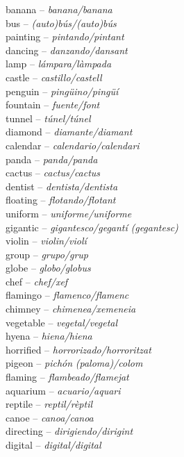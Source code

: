 \documentclass[output=paper,modfonts,nonflat,newtxmath]{langsci/langscibook}
\begin{document}
\noindent
banana  – \textit{banana/banana} \\
bus  – \textit{(auto)bús/(auto)bús}\\
painting  – \textit{pintando/pintant}\\
dancing  – \textit{danzando/dansant}\\
lamp  – \textit{lámpara/làmpada}\\
castle  – \textit{castillo/castell}\\
penguin  – \textit{pingüino/pingüí}\\
fountain  – \textit{fuente/font}\\
tunnel  – \textit{túnel/túnel} \\
diamond  – \textit{diamante/diamant} \\
calendar  – \textit{calendario/calendari} \\
panda  – \textit{panda/panda}\\
cactus  – \textit{cactus/cactus}\\
dentist  – \textit{dentista/dentista} \\
floating  – \textit{flotando/flotant} \\
uniform  – \textit{uniforme/uniforme} \\
gigantic  – \textit{gigantesco/gegantí} \textit{(gegantesc)}\\
violin  – \textit{violin/violí} \\
group  – \textit{grupo/grup} \\
globe  – \textit{globo/globus} \\
chef  – \textit{chef/xef} \\
flamingo  – \textit{flamenco/flamenc} \\
chimney  – \textit{chimenea/xemeneia} \\
vegetable  – \textit{vegetal/vegetal} \\
hyena  – \textit{hiena/hiena} \\
horrified  – \textit{horrorizado/horroritzat} \\
pigeon  – \textit{pichón} \textit{(paloma)/colom} \\
flaming  – \textit{flambeado/flamejat}\\
aquarium  – \textit{acuario/aquari} \\
reptile  – \textit{reptil/rèptil}\\
canoe  – \textit{canoa/canoa} \\
directing  – \textit{dirigiendo/dirigint} \\
digital  – \textit{digital/digital} \\
\end{document}
